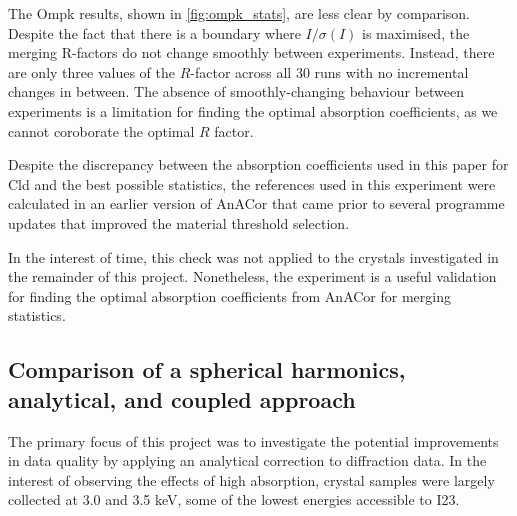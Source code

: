 The Ompk results, shown in \cref{fig:ompk_stats}, are less clear by comparison. Despite the fact that there is a boundary where $I/\sigma(I)$ is maximised, the merging R-factors do not change smoothly between experiments. Instead, there are only three values of the $R$-factor across all 30 runs with no incremental changes in between. %
The absence of smoothly-changing behaviour between experiments is a limitation for finding the optimal absorption coefficients, as we cannot coroborate the optimal $R$ factor.%




Despite the discrepancy between the absorption coefficients used in this paper for Cld and the best possible statistics, the references used in this experiment were calculated in an earlier version of AnACor that came prior to several programme updates that improved the material threshold selection.

In the interest of time, this check was not applied to the crystals investigated in the remainder of this project. Nonetheless, the experiment is a useful validation for finding the optimal absorption coefficients from AnACor for merging statistics. %


\subsection{Comparison of a spherical harmonics, analytical, and coupled approach} %
The primary focus of this project was to investigate the potential improvements in data quality by applying an analytical correction to diffraction data.
In the interest of observing the effects of high absorption, crystal samples were largely collected at 3.0 and 3.5 \unit{keV}, some of the lowest energies accessible to I23.

